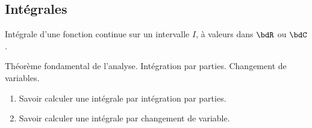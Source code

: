 \documentclass[a4paper,french,bookmarks]{article}
\begin{document}
\subsection*{Intégrales}

\begin{enumerate}
    \ithand Intégrale d’une fonction continue sur un intervalle $I$, à valeurs dans $\bdR$ ou $\bdC$.

    \ithand Théorème fondamental de l’analyse. Intégration par parties. Changement de variables.
\end{enumerate}

\savoirfaire

\begin{enumerate}
    \item Savoir calculer une intégrale par intégration par parties.
    
    \item Savoir calculer une intégrale par changement de variable.
\end{enumerate}

\questionsdecours
\end{document}
